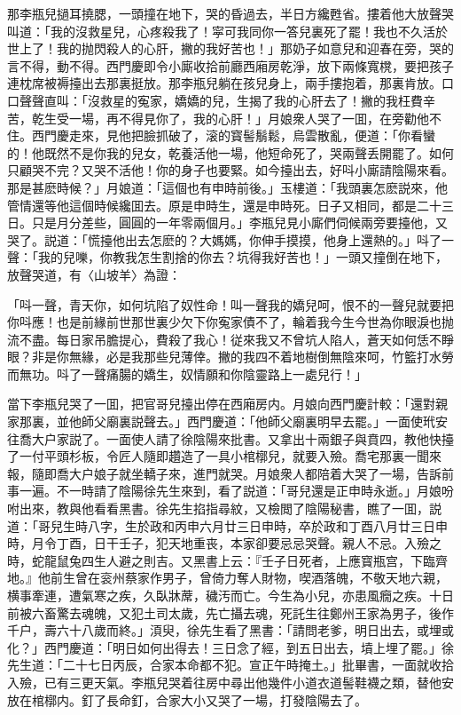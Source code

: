那李瓶兒撾耳撓腮，一頭撞在地下，哭的昏過去，半日方纔甦省。摟着他大放聲哭叫道：「我的沒救星兒，心疼殺我了！寜可我同你一答兒裏死了罷！我也不久活於世上了！我的抛閃殺人的心肝，撇的我好苦也！」那奶子如意兒和迎春在旁，哭的言不得，動不得。西門慶即令小廝收拾前廳西廂房乾淨，放下兩條寬櫈，要把孩子連枕席被褥擡出去那裏挺放。那李瓶兒躺在孩兒身上，兩手摟抱着，那裏肯放。口口聲聲直叫：「沒救星的寃家，嬌嬌的兒，生揭了我的心肝去了！撇的我枉費辛苦，乾生受一場，再不得見你了，我的心肝！」月娘衆人哭了一囬，在旁勸他不住。西門慶走來，見他把臉抓破了，滚的寳髻鬅鬆，烏雲散亂，便道：「你看蠻的！他既然不是你我的兒女，乾養活他一場，他短命死了，哭兩聲丢開罷了。如何只顧哭不完？又哭不活他！你的身子也要緊。如今擡出去，好呌小廝請陰陽來看。那是甚麽時候？」月娘道：「這個也有申時前後。」玉樓道：「我頭裏怎麽説來，他管情還等他這個時候纔囬去。原是申時生，還是申時死。日子又相同，都是二十三日。只是月分差些，圓圓的一年零兩個月。」李瓶兒見小廝們伺候兩旁要擡他，又哭了。説道：「慌擡他出去怎麽的？大媽媽，你伸手摸摸，他身上還熱的。」呌了一聲：「我的兒嚛，你教我怎生割捨的你去？坑得我好苦也！」一頭又撞倒在地下，放聲哭道，有〈山坡羊〉為證：

「呌一聲，青天你，如何坑陷了奴性命！叫一聲我的嬌兒呵，恨不的一聲兒就要把你呌應！也是前緣前世那世裏少欠下你寃家債不了，輪着我今生今世為你眼淚也抛流不盡。每日家吊膽提心，費殺了我心！従來我又不曾坑人陷人，蒼天如何恁不睜眼？非是你無緣，必是我那些兒薄倖。撇的我四不着地樹倒無陰來呵，竹籃打水勞而無功。呌了一聲痛腸的嬌生，奴情願和你陰靈路上一處兒行！」

當下李瓶兒哭了一囬，把官哥兒擡出停在西廂房内。月娘向西門慶計較：「還對親家那裏，並他師父廟裏説聲去。」西門慶道：「他師父廟裏明早去罷。」一面使玳安往喬大户家説了。一面使人請了徐陰陽來批書。又拿出十兩銀子與賁四，教他快擡了一付平頭杉板，令匠人隨即趲造了一具小棺槨兒，就要入殮。喬宅那裏一聞來報，隨即喬大户娘子就坐轎子來，進門就哭。月娘衆人都陪着大哭了一場，告訴前事一遍。不一時請了陰陽徐先生來到，看了説道：「哥兒還是正申時永逝。」月娘吩咐出來，教與他看看黑書。徐先生掐指尋紋，又檢閲了陰陽秘書，瞧了一囬，説道：「哥兒生時八字，生於政和丙申六月廿三日申時，卒於政和丁酉八月廿三日申時，月令丁酉，日干壬子，犯天地重丧，本家卻要忌忌哭聲。親人不忌。入殮之時，蛇龍鼠兔四生人避之則吉。又黑書上云：『壬子日死者，上應寳瓶宫，下臨齊地。』他前生曾在衮州蔡家作男子，曾倚力奪人財物，喫酒落魄，不敬天地六親，横事牽連，遭氣寒之疾，久臥牀蓆，穢汚而亡。今生為小兒，亦患風癇之疾。十日前被六畜驚去魂魄，又犯土司太歲，先亡攝去魂，死託生往鄭州王家為男子，後作千户，壽六十八歲而終。」湏臾，徐先生看了黑書：「請問老爹，明日出去，或埋或化？」西門慶道：「明日如何出得去！三日念了經，到五日出去，墳上埋了罷。」徐先生道：「二十七日丙辰，合家本命都不犯。宣正午時掩土。」批畢書，一面就收拾入殮，已有三更天氣。李瓶兒哭着往房中尋出他幾件小道衣道髻鞋襪之類，替他安放在棺槨内。釘了長命釘，合家大小又哭了一場，打發陰陽去了。

